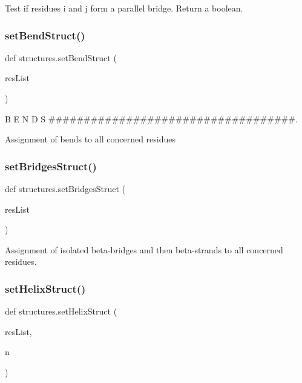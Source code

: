 \begin{DoxyVerb}Test if residues i and j form a parallel bridge. Return a boolean.\end{DoxyVerb}
 \mbox{\label{namespacestructures_a6588a3b5c9f8ea0f2937bd1a08342a5b}} 
\subsubsection{\texorpdfstring{set\+Bend\+Struct()}{setBendStruct()}}
{\footnotesize\ttfamily def structures.\+set\+Bend\+Struct (\begin{DoxyParamCaption}\item[{}]{res\+List }\end{DoxyParamCaption})}



B E N D S \#\#\#\#\#\#\#\#\#\#\#\#\#\#\#\#\#\#\#\#\#\#\#\#\#\#\#\#\#\#\#\#\#\#\#. 

\begin{DoxyVerb}Assignment of bends to all concerned residues\end{DoxyVerb}
 \mbox{\label{namespacestructures_a1a156b836f27d7708a3e65951ffc9567}} 
\subsubsection{\texorpdfstring{set\+Bridges\+Struct()}{setBridgesStruct()}}
{\footnotesize\ttfamily def structures.\+set\+Bridges\+Struct (\begin{DoxyParamCaption}\item[{}]{res\+List }\end{DoxyParamCaption})}

\begin{DoxyVerb}Assignment of isolated beta-bridges and then beta-strands to all concerned residues.\end{DoxyVerb}
 \mbox{\label{namespacestructures_a4e2befc32cf9e8825a361f4d2ff17a85}} 
\subsubsection{\texorpdfstring{set\+Helix\+Struct()}{setHelixStruct()}}
{\footnotesize\ttfamily def structures.\+set\+Helix\+Struct (\begin{DoxyParamCaption}\item[{}]{res\+List,  }\item[{}]{n }\end{DoxyParamCaption})}

